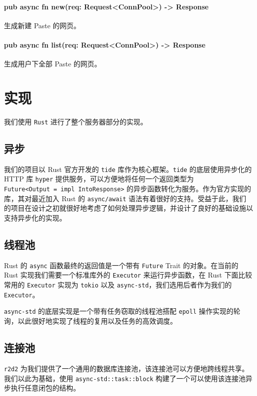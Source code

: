 \documentclass[ichigo,normal,cn]{elegantnote}
\newcommand{\code}[1]{\colorbox{light-gray}{\texttt{#1}}}
\begin{document}
\paragraph{pub async fn new(req: Request<ConnPool>) -> Response}
生成新建 Paste 的网页。

\paragraph{pub async fn list(req: Request<ConnPool>) -> Response}
生成用户下全部 Paste 的网页。

\section{实现}

我们使用 \code{Rust} 进行了整个服务器部分的实现。

\subsection{异步}
我们的项目以 Rust 官方开发的 \code{tide} 库作为核心框架。\code{tide} 的底层使用异步化的 HTTP 库 \code{hyper} 提供服务，可以方便地将任何一个返回类型为 \\ \code{Future<Output = impl IntoResponse>} 的异步函数转化为服务。作为官方实现的库，其对最近加入 Rust 的 \code{async/await} 语法有着很好的支持。受益于此，我们的项目在设计之初就很好地考虑了如何处理异步逻辑，并设计了良好的基础设施以支持异步化的实现。

\subsection{线程池}
Rust 的 \code{async} 函数最终的返回值是一个带有 \code{Future} Trait 的对象。在当前的 Rust 实现我们需要一个标准库外的 \code{Executor} 来运行异步函数，在 Rust 下面比较常用的 \code{Executor} 实现为 \code{tokio} 以及 \code{async-std}，我们选用后者作为我们的 \code{Executor}。

\code{async-std} 的底层实现是一个带有任务窃取的线程池搭配 \code{epoll} 操作实现的轮询，以此很好地实现了线程的复用以及任务的高效调度。

\subsection{连接池}
\code{r2d2} 为我们提供了一个通用的数据库连接池，该连接池可以方便地跨线程共享。我们以此为基础，使用 \code{async-std::task::block} 构建了一个可以使用该连接池异步执行任意闭包的结构。
\end{document}
